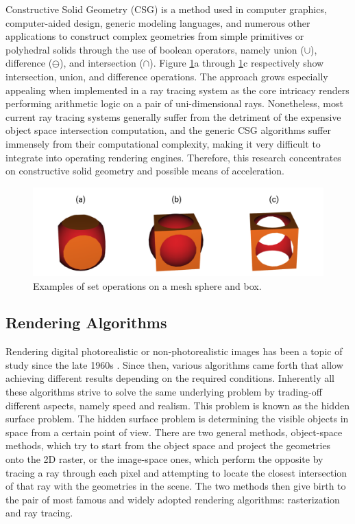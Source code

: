 \documentclass[a4paper,11pt,oneside]{article}
\begin{document}
Constructive Solid Geometry (CSG) is a method used in computer graphics, computer-aided design, generic modeling languages, and numerous other applications to construct complex geometries from simple primitives or polyhedral solids through the use of boolean operators, namely union ($\cup$),  difference ($\ominus$), and intersection ($\cap$). Figure \ref{fig1:set_operations_examples}a through \ref{fig1:set_operations_examples}c respectively show intersection, union, and difference operations. The approach grows especially appealing when implemented in a ray tracing system as the core intricacy renders performing arithmetic logic on a pair of uni-dimensional rays. Nonetheless, most current ray tracing systems generally suffer from the detriment of the expensive object space intersection computation, and the generic CSG algorithms suffer immensely from their computational complexity, making it very difficult to integrate into operating rendering engines. Therefore, this research concentrates on constructive solid geometry and possible means of acceleration.
  
\begin{figure}[ht]
	\begin{center}
		\includegraphics[width=.6\textwidth]{intro-figures/figure1.png}
	\end{center}
	\caption{Examples of set operations on a mesh sphere and box.}
	\label{fig1:set_operations_examples}
\end{figure}
  
\subsection{Rendering Algorithms}
  
Rendering digital photorealistic or non-photorealistic images has been a topic of study since the late 1960s \cite{INITIAL_RENDERING}. Since then, various algorithms came forth that allow achieving different results depending on the required conditions. Inherently all these algorithms strive to solve the same underlying problem by trading-off different aspects, namely speed and realism. This problem is known as the hidden surface problem. The hidden surface problem is determining the visible objects in space from a certain point of view. There are two general methods, object-space methods, which try to start from the object space and project the geometries onto the 2D raster, or the image-space ones, which perform the opposite by tracing a ray through each pixel and attempting to locate the closest intersection of that ray with the geometries in the scene. The two methods then give birth to the pair of most famous and widely adopted rendering algorithms: rasterization and ray tracing.
  
\end{document}
